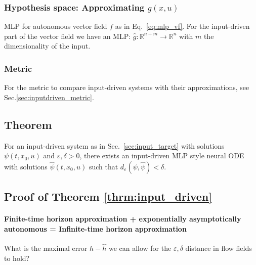 \documentclass{article}
\newcommand{\reals}{\mathbb{R}}
\newcounter{ct}
\begin{document}


\subsubsection{Hypothesis space: Approximating $g(x,u)$}\label{sec:input_hypothesis} %
MLP for autonomous vector field $f$ as in Eq.~\ref{eq:mlp_vf}.
For the input-driven part of the vector field we have an MLP:
 $\hat g\colon \reals^{n+m} \rightarrow \reals^{n}$ with $m$ the dimensionality of the input.


\subsubsection{Metric}\label{sec:input_metric} 
For the metric to compare input-driven systems with their approximations, see Sec.\ref{sec:inputdriven_metric}.




\subsection{Theorem}
\begin{theorem}\label{thrm:input_driven}
For an input-driven system as in Sec.~\ref{sec:input_target} %
with solutions  $\psi(t,x_0,u)$
and $\varepsilon, \delta>0$, there exists an input-driven MLP style neural ODE %
with solutions  $\hat \psi(t,x_0,u)$ such that 
$d_\varepsilon(\psi,\hat\psi)<\delta$.
\end{theorem}


\subsection{Proof of Theorem \ref{thrm:input_driven}}
\paragraph{Finite-time horizon approximation + exponentially asymptotically autonomous = Infinite-time horizon approximation}
What is the maximal error $h-\hat h$ we can allow for the $\varepsilon,\delta$ distance in flow fields to hold?
\end{document}
